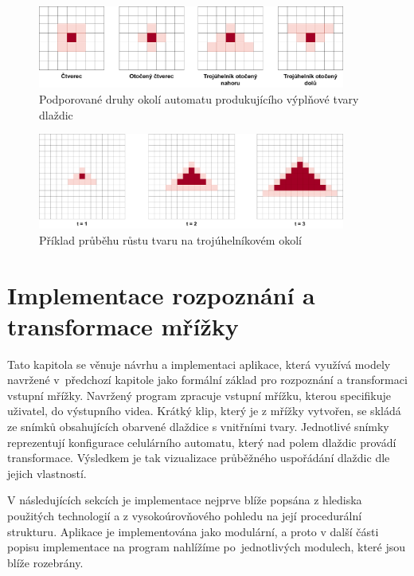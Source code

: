 \begin{figure}[H]
    \centering
    \includegraphics[width=0.9\textwidth]{obrazky-figures/VnitrniTvar.pdf}
    \caption{Podporované druhy okolí automatu produkujícího výplňové tvary dlaždic}
    \label{fig:VnitrniTvar}
\end{figure}

\begin{figure}[H]
    \centering
    \includegraphics[width=0.9\textwidth]{obrazky-figures/RustTvaru.pdf}
    \caption{Příklad průběhu růstu tvaru na trojúhelníkovém okolí}
    \label{fig:RustTvaru}
\end{figure}

\chapter{Implementace rozpoznání a transformace mřížky} 
\label{impl}

Tato kapitola se věnuje návrhu a implementaci aplikace, která využívá modely navržené v~předchozí kapitole jako formální základ pro rozpoznání a transformaci vstupní mřížky. Navržený program zpracuje vstupní mřížku, kterou specifikuje uživatel, do výstupního videa. Krátký klip, který je z mřížky vytvořen, se skládá ze snímků obsahujících obarvené dlaždice s vnitřními tvary. Jednotlivé snímky reprezentují konfigurace celulárního automatu, který nad polem dlaždic provádí transformace. Výsledkem je tak vizualizace průběžného uspořádání dlaždic dle jejich vlastností. 

V následujících sekcích je implementace nejprve blíže popsána z hlediska použitých technologií a z vysokoúrovňového pohledu na její procedurální strukturu. Aplikace je implementována jako modulární, a proto v další části popisu implementace na program nahlížíme po~jednotlivých modulech, které jsou blíže rozebrány.

